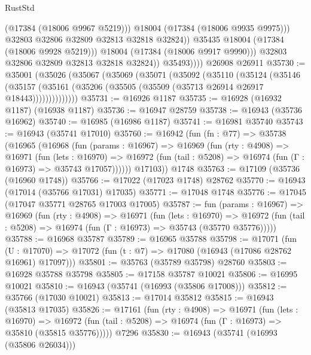 \begin{lexlean}{RustStd}
\begin{coremodule}
                            (@17384 (@18006 @9967 @5219)))
                          @18004
                          (@17384 (@18006 @9935 @9975)))
                        @32803
                        @32806
                        @32809
                        @32813
                        @32818
                        @32824))
                    @35435
                    @18004
                    (@17384 (@18006 @9928 @5219)))
                  @18004
                  (@17384 (@18006 @9917 @9990)))
                @32803
                @32806
                @32809
                @32813
                @32818
                @32824))
            @35493))))
    @26908
    @26911
@35730 := @35001
    (@35026
      (@35067
        (@35069
          (@35071
            (@35092
              (@35110
                (@35124
                  (@35146
                    (@35157
                      (@35161 (@35206 (@35505 (@35509 (@35713 @26914 @26917 @18443))))))))))))))
@35731 := @16926 @1187
@35735 := @16928 (@16932 @1187) (@16938 @1187)
@35736 := @16947 @28759
@35738 := @16943 (@35736 @16962)
@35740 := @16985 (@16986 @1187)
@35741 := @16981 @35740
@35743 := @16943 (@35741 @17010)
@35760 := @16942
    (fun (fn : @77) =>
    @35738
      (@16965
        (@16968
          (fun (params : @16967) =>
          @16969
            (fun (rty : @4908) =>
            @16971
              (fun (lets : @16970) =>
              @16972 (fun (tail : @5208) => @16974 (fun (Γ : @16973) => @35743 @17057))))))
        @17103))
    @1748
@35763 := @17109 (@35736 (@16960 @1748))
@35766 := @17022 (@17023 @1748) @28762
@35770 := @16943 (@17014 (@35766 @17031) @17035)
@35771 := @17048 @1748
@35776 := @17045 (@17047 @35771 @28765 @17003 @17005)
@35787 := fun (params : @16967) =>
  @16969
    (fun (rty : @4908) =>
    @16971
      (fun (lets : @16970) =>
      @16972 (fun (tail : @5208) => @16974 (fun (Γ : @16973) => @35743 (@35770 @35776)))))
@35788 := @16968 @35787
@35789 := @16965 @35788
@35798 := @17071
    (fun (U : @17070) => @17072 (fun (t : @7) => @17080 (@16943 (@17086 @28762 @16961) @17097)))
@35801 := @35763 (@35789 @35798) @28760
@35803 := @16928 @35788 @35798
@35805 := @17158 @35787 @10021
@35806 := @16995 @10021
@35810 := @16943 (@35741 (@16993 (@35806 @17008)))
@35812 := @35766 (@17030 @10021)
@35813 := @17014 @35812
@35815 := @16943 (@35813 @17035)
@35826 := @17161
    (fun (rty : @4908) =>
    @16971
      (fun (lets : @16970) =>
      @16972 (fun (tail : @5208) => @16974 (fun (Γ : @16973) => @35810 (@35815 @35776)))))
    @7296
@35830 := @16943 (@35741 (@16993 (@35806 @26034)))

\end{coremodule}
\end{lexlean}
